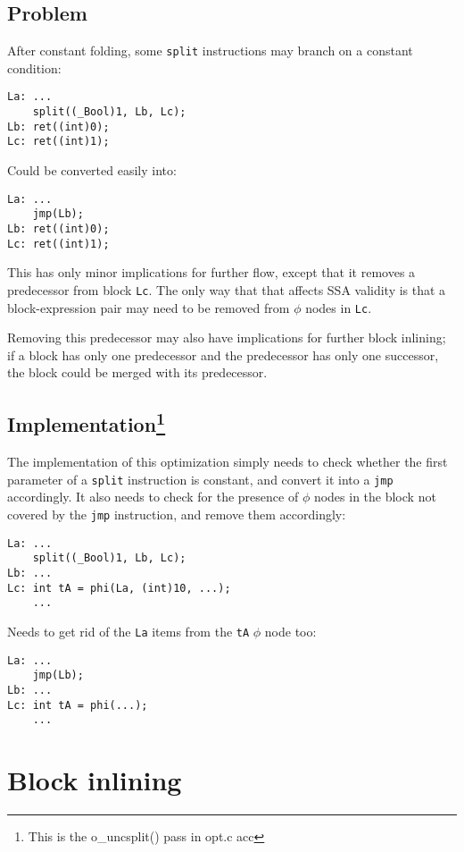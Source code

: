 \documentclass[12pt, a4paper]{article}
\begin{document}
\subsection{Problem}
After constant folding, some \verb+split+ instructions may branch on a constant
condition:

\begin{lstlisting}
La:	...
	split((_Bool)1, Lb, Lc);
Lb:	ret((int)0);
Lc:	ret((int)1);
\end{lstlisting}

Could be converted easily into:

\begin{lstlisting}
La:	...
	jmp(Lb);
Lb:	ret((int)0);
Lc:	ret((int)1);
\end{lstlisting}

This has only minor implications for further flow, except that it removes a
predecessor from block \verb+Lc+. The only way that that affects SSA validity is
that a block-expression pair may need to be removed from $\phi$ nodes in
\verb+Lc+.

Removing this predecessor may also have implications for further block inlining;
if a block has only one predecessor and the predecessor has only one successor,
the block could be merged with its predecessor.

\subsection[Implementation] {Implementation\footnote{This is the o\_uncsplit() pass in opt.c acc} }
The implementation of this optimization simply needs to check whether the first
parameter of a \verb+split+ instruction is constant, and convert it into a
\verb+jmp+ accordingly. It also needs to check for the presence of $\phi$ nodes
in the block not covered by the \verb+jmp+ instruction, and remove them accordingly:

\begin{lstlisting}
La:	...
	split((_Bool)1, Lb, Lc);
Lb:	...
Lc:	int tA = phi(La, (int)10, ...);
	...
\end{lstlisting}

Needs to get rid of the \verb+La+ items from the \verb+tA+ $\phi$ node too:

\begin{lstlisting}
La:	...
	jmp(Lb);
Lb:	...
Lc:	int tA = phi(...);
	...
\end{lstlisting}


\section{Block inlining}
\end{document}
